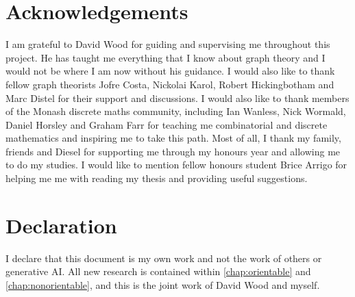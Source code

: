 \section{Acknowledgements}
I am grateful to David Wood for guiding and supervising me throughout this project. He has taught me everything that I know about graph theory and I would not be where I am now without his guidance. I would also like to thank fellow graph theorists Jofre Costa, Nickolai Karol, Robert Hickingbotham and Marc Distel for their support and discussions. I would also like to thank members of the Monash discrete maths community, including Ian Wanless, Nick Wormald, Daniel Horsley and Graham Farr for teaching me combinatorial and discrete mathematics and inspiring me to take this path. Most of all, I thank my family, friends and Diesel for supporting me through my honours year and allowing me to do my studies. I would like to mention fellow honours student Brice Arrigo for helping me me with reading my thesis and providing useful suggestions.

\section{Declaration}

I declare that this document is my own work and not the work of others or generative AI. All new research is contained within \cref{chap:orientable} and \cref{chap:nonorientable}, and this is the joint work of David Wood and myself.